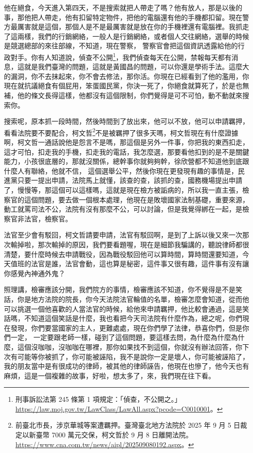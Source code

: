 \hypertarget{c11:cue:175}{}他在絕食，今天進入第四天，不是搜索就把人帶走了嗎？他有放人，那是以後的事，那他把人帶走，他有扣留特定物件，把他的電腦還有他的手機都扣留。現在警方最厲害就是這個，那個人是不是最厲害就是放在你的手機裡還有電腦裡。我抓走了這兩樣，我們的行銷網絡，一般人是行銷網絡，或者個人交往網絡，選舉的時候是競選總部的來往部線，不知道，現在警察，
\hypertarget{c11:cue:176}{}警察官會把這個資訊透露給他的行政對手。你有人知道說，偵查不公開\footnote{刑事訴訟法第 245 條第 1 項規定：「偵查，不公開之。」\url{https://law.moj.gov.tw/LawClass/LawAll.aspx?pcode=C0010001}。}，我們偵查每天在公開，禁報每天都有消息，這就是我們臺灣的問題，這就是黃國昌的問題，可以你還是學術手法。這麼大的漏洞，你不去抹起來，你不會去修法，那你活。你現在已經看到了他的濫用，你現在就抗議絕食有個屁用，笨蛋國民黨，你決一死了，你絕食就算死了，於是也無補，他的條文長得這樣，他都沒有這個限制，你們覺得是可不可怕，動不動就來搜索你。

\hypertarget{c11:cue:177}{}搜索呢，原本抓一段時間，然後時間到了放出來，他可以不放，他可以申請羈押，看看法院要不要配合，柯文哲\footnote{前臺北市長，涉京華城等案遭羈押。臺灣臺北地方法院於 2025 年 9 月 5 日裁定以新臺幣 7000 萬元交保，柯文哲於 9 月 8 日離開法院。\url{https://www.cna.com.tw/news/aipl/202509080192.aspx}。}不是被羈押了很多天嗎，柯文哲現在有什麼證據啊，柯文哲一通話說他是怨言不是嗎，那這個是另外一件事，你把我的東西扣走，這才可怕，扣走我的手機，扣走我的電話，我怎麼選，那要看他扣到的是不是關鍵能力，小孩很底層的，那就沒關係，總幹事你就夠夠幹，徐欣營都不知道他到底跟什麼人有聯絡，他就不信，
\hypertarget{c11:cue:178}{}這個選舉公平，然後你現在更發現有趣的事情是，民進黨只要一提出申請，法院馬上就懂，該查的查，該抓的查，國務機場提出申請了，慢慢等，那這個可以這樣嗎，這就是現在檢方被詬病的，所以我一直主張，檢察官的這個問題，要去做一個根本處理，他現在是敗壞國家法制基礎，重要來源，動工就罵司法不公，法院有沒有那麼不公，可以討論，但是我覺得綁在一起，是檢察官非法官，檢察官。

\hypertarget{c11:cue:179}{}法官至少會有駁回，柯文哲請要申請，法官有駁回啊，是到了上訴以後又來一次那次輸掉啦，那次輸掉的原因，我們要看題喔，現在是細節我騙講的，聽說律師都很清楚，要什麼時候去申請戰役，因為戰役駁回他可以算時間，算時間還要知道，今天值班的法官是誰，法官會動，這也算是秘密，這件事又很有趣，這件事有沒有讓你感覺內神通外鬼？

\hypertarget{c11:cue:180}{}照理講，檢審應該分開，我們院方的事情，檢審應該不知道，你不覺得是不是笑話，你是地方法院的院長，你今天法院法官輪值的名單，檢審怎麼會知道，從而他可以挑選一個他喜歡的人當法官的時候，給他來申請羈押，他比較會通過，這是笑話嗎，不知道這個笑話是什麼，我也看把今天司法院有什麼作為，總之呢，你們現在發現，你們要當國家的主人，更難處處，現在你們學了法律，恭喜你們，但是你們一定，
\hypertarget{c11:cue:181}{}一定要跟老師一樣，碰到了這個問題，要這樣去問，為什麼為什麼為什麼，這個沒咖咖，沒咖咖在哪裡，那你如果找不到這個，你就沒有辦法回答，你下次有可能等你被抓了，你可能被誣陷，我不是說你一定是壞人，你可能被誣陷了，我的朋友當中是有很成功的律師，被其他的律師誣告，他現在也慘了，他今天也有麻煩，這是一個複雜的故事，好啦，想太多了，來，我們現在往下看。

